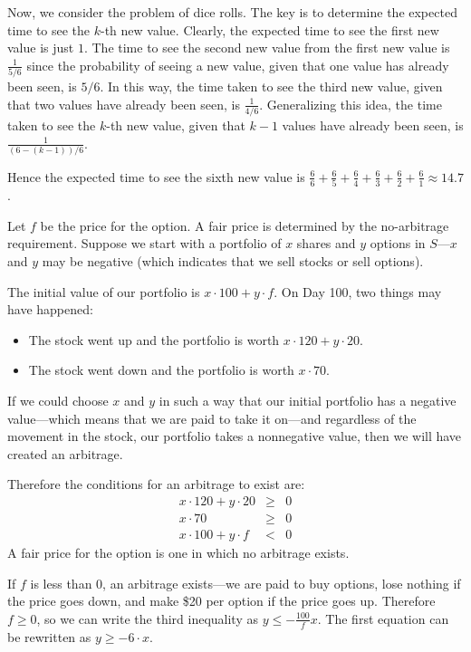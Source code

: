 Now, we consider the problem of dice rolls. The key is to determine the expected time to see the
$k$-th new value. Clearly, the expected time to see the first new value is just $1$. The time to see
the second new value from the first new value is $\frac{1}{5/6}$ since the probability of
seeing a new value, given that one value has already been seen, is $5/6$. In this way, the time
taken to see the third new value, given that two values have already been seen, is $\frac{1}{4/6}$.
Generalizing this idea, the time taken to see the $k$-th new value, given that $k-1$ values have already been seen, is $\frac{1}{(6- (k-1)) /6}$.

Hence the expected time to see the sixth new value is $\frac{6}{6} + \frac{6}{5} + \frac{6}{4} + \frac{6}{3} + \frac{6}{2} + \frac{6}{1}
\approx 14.7$.


Let $f$ be the price for the option.
A fair price is determined by the no-arbitrage requirement. 
Suppose we start with a portfolio of $x$ shares  
and $y$ options in $S$---$x$ and $y$ may be 
negative (which indicates that we sell stocks or sell options).

The initial value of our portfolio is $x\cdot 100 +y\cdot f$. 
On Day 100, two things may have happened:
\begin{itemize} 
\item The stock went up and the portfolio is worth $x\cdot 120 + y\cdot 20$.
\item The stock went down and the portfolio is worth  $x\cdot 70$.
\end{itemize} 
If we could choose $x$ and $y$ in such a way that our initial portfolio
has a negative value---which means that we are paid to take it on---and
regardless of the movement in the stock, our portfolio takes a 
nonnegative value, then we will have created an arbitrage.

Therefore the conditions for an arbitrage to exist are:
\begin{eqnarray*}
x\cdot 120 + y\cdot 20 & \geq & 0 \\
x\cdot 70 & \geq & 0 \\
x\cdot 100 + y \cdot f  & < & 0 
\end{eqnarray*}
A fair price for the option is one in which no arbitrage exists.

If $f$ is less than $0$, an arbitrage exists---we are paid to buy options,
lose nothing if the price goes down, and make \$20 per option
if the price goes up. Therefore $f \geq 0$, so we can write the third
inequality as $y \leq -\frac{100}{f} x$.
The first equation can be rewritten as $y \geq -6\cdot x$.

